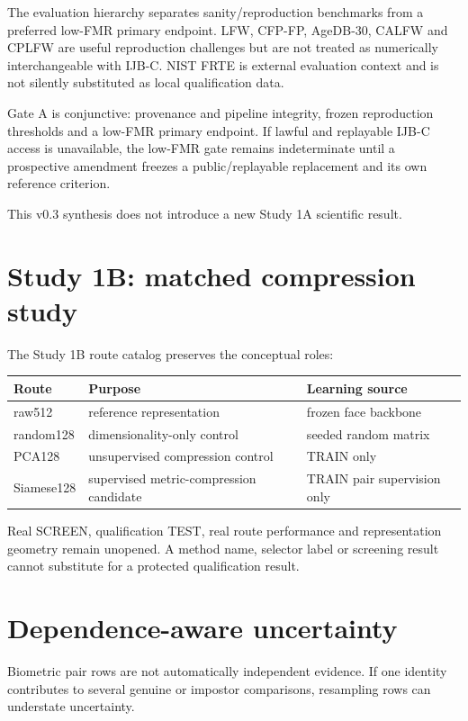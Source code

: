\documentclass[10pt,a4paper]{article}
\begin{document}
The evaluation hierarchy separates sanity/reproduction benchmarks from a preferred low-FMR primary endpoint.
LFW, CFP-FP, AgeDB-30, CALFW and CPLFW are useful reproduction challenges but are not treated as numerically
interchangeable with IJB-C. NIST FRTE is external evaluation context and is not silently substituted as local
qualification data.

Gate A is conjunctive: provenance and pipeline integrity, frozen reproduction thresholds and a low-FMR primary
endpoint. If lawful and replayable IJB-C access is unavailable, the low-FMR gate remains indeterminate until a
prospective amendment freezes a public/replayable replacement and its own reference criterion.

This v0.3 synthesis does not introduce a new Study 1A scientific result.

\section{Study 1B: matched compression study}

The Study 1B route catalog preserves the conceptual roles:

\begin{table}[ht]
\centering
\begin{tabularx}{\linewidth}{l X X}
\toprule
\textbf{Route} & \textbf{Purpose} & \textbf{Learning source}\\
\midrule
raw512 & reference representation & frozen face backbone\\
random128 & dimensionality-only control & seeded random matrix\\
PCA128 & unsupervised compression control & TRAIN only\\
Siamese128 & supervised metric-compression candidate & TRAIN pair supervision only\\
\bottomrule
\end{tabularx}
\end{table}

Real SCREEN, qualification TEST, real route performance and representation geometry remain unopened.
A method name, selector label or screening result cannot substitute for a protected qualification result.

\section{Dependence-aware uncertainty}

Biometric pair rows are not automatically independent evidence. If one identity contributes to several genuine
or impostor comparisons, resampling rows can understate uncertainty.
\end{document}
